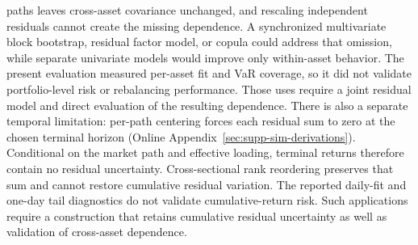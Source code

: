 paths leaves cross-asset covariance unchanged, and rescaling
independent residuals cannot create the missing dependence. A
synchronized multivariate block bootstrap, residual factor model, or
copula could address that omission, while separate univariate models
would improve only within-asset behavior. The present evaluation
measured per-asset fit and VaR coverage, so it did not validate
portfolio-level risk or rebalancing performance. Those uses require a
joint residual model and direct evaluation of the resulting dependence.
There is also a separate temporal limitation: per-path centering
forces each residual sum to zero at the chosen terminal horizon
(Online Appendix~\ref{sec:supp-sim-derivations}). Conditional on the
market path and effective loading, terminal returns therefore contain
no residual uncertainty. Cross-sectional rank reordering preserves
that sum and cannot restore cumulative residual variation. The
reported daily-fit and one-day tail diagnostics do not validate
cumulative-return risk. Such applications require a construction that
retains cumulative residual uncertainty as well as validation of
cross-asset dependence.
